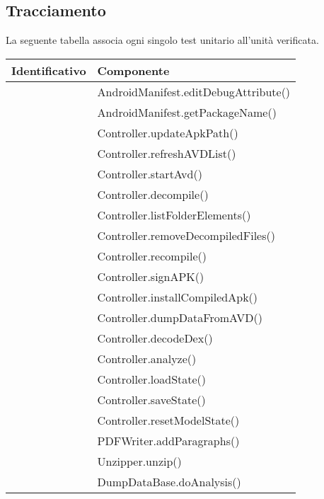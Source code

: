 \subsection{Tracciamento}\label{subsec:tracciamento-unitari}
La seguente tabella associa ogni singolo test unitario all'unità verificata.
\begin{longtable}{ |C{3cm} |C{10.5cm}|}
    \hline
    \textbf{Identificativo} &
    \textbf{Componente} \\\hline
     & AndroidManifest.editDebugAttribute()       \\\hline
     & AndroidManifest.getPackageName()           \\\hline
     & Controller.updateApkPath()                 \\\hline
     & Controller.refreshAVDList()                \\\hline
     & Controller.startAvd()                      \\\hline
     & Controller.decompile()                     \\\hline
     & Controller.listFolderElements()            \\\hline
     & Controller.removeDecompiledFiles()         \\\hline
     & Controller.recompile()                     \\\hline
     & Controller.signAPK()                       \\\hline
     & Controller.installCompiledApk()            \\\hline
     & Controller.dumpDataFromAVD()               \\\hline
     & Controller.decodeDex()                     \\\hline
     & Controller.analyze()                       \\\hline
     & Controller.loadState()                     \\\hline
     & Controller.saveState()                     \\\hline
     & Controller.resetModelState()               \\\hline
     & PDFWriter.addParagraphs()                  \\\hline
     & Unzipper.unzip()                           \\\hline
     & DumpDataBase.doAnalysis()                  \\\hline

\end{longtable}
